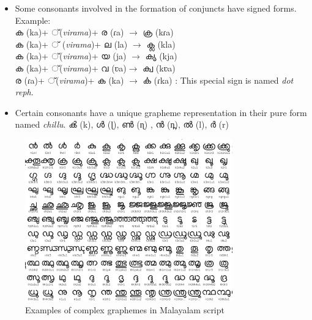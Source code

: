 \documentclass[10pt]{article}
\begin{document}
\begin{itemize}
	\item
	Some consonants involved in the formation of conjuncts have signed forms. Example:\\ {\manjari ക} (ka)+ {\manjari ്}(\textit{virama})+ {\manjari ര} (ɾa) $\rightarrow$ {\manjari ക്ര} (kɾa)\\ 
	{\manjari ക} (ka)+ {\manjari ് }(\textit{virama})+ {\manjari ‌ല} (la) $\rightarrow$ {\manjari ക്ല} (kla)\\ {\manjari ക} (ka)+ {\manjari ്}(\textit{virama})+ {\manjari ‌യ} (ja) $\rightarrow$  {\manjari ക്യ} (kja)\\  {\manjari ക} (ka)+ {\manjari ്}(\textit{virama})+ {\manjari വ} (ʋa)$\rightarrow$  {\manjari ക്വ} (kʋa) \\  {\manjari ര} (ɾa)+ {\manjari ്}(\textit{virama})+ {\manjari ക} (ka) $\rightarrow$  {\manjari ൎക } (ɾka) : This special sign is named \textit{dot reph}.
	
	        
	\item 
	Certain consonants have a unique grapheme representation in their pure form named \textit{chillu}. {\manjari ൿ} (k), {\manjari ൾ} (ɭ), {\manjari ൺ} (ɳ) , {\manjari ൻ} (n̪), {\manjari ൽ} (l), {\manjari ർ} (r)
\end{itemize}


\begin{figure}[h!]
	\centering
	\includegraphics[width=0.8\textwidth]{images/complexgraphemes.png}
	\caption{Examples of complex graphemes in Malayalam script}
	\label{complexgrapheme}
\end{figure}
\end{document}

